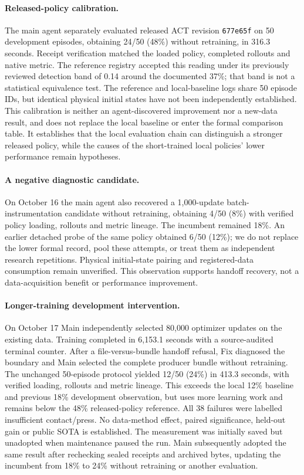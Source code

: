 \documentclass[10pt,twocolumn,letterpaper]{article}
\begin{document}
\paragraph{Released-policy calibration.}
The main agent separately evaluated released ACT revision
\texttt{677e65f} on 50 development episodes, obtaining 24/50 (48\%)
without retraining, in 316.3 seconds. Receipt verification matched the loaded
policy, completed rollouts and native metric. The reference registry accepted
this reading under its previously reviewed detection band of 0.14 around the
documented 37\%; that band is not a statistical equivalence test. The reference
and local-baseline logs share 50 episode IDs, but identical physical initial
states have not been independently established. This calibration is neither an
agent-discovered improvement nor a new-data result, and does not replace the
local baseline or enter the formal comparison table. It establishes that the
local evaluation chain can distinguish a stronger released policy, while the
causes of the short-trained local policies' lower performance remain hypotheses.

\paragraph{A negative diagnostic candidate.}
On October 16 the main agent also recovered a 1,000-update batch-instrumentation
candidate without retraining, obtaining 4/50 (8\%) with verified policy loading,
rollouts and metric lineage. The incumbent remained 18\%. An earlier detached
probe of the same policy obtained 6/50 (12\%); we do not replace the lower formal
record, pool these attempts, or treat them as independent research repetitions.
Physical initial-state pairing and registered-data consumption remain unverified.
This observation supports handoff recovery, not a data-acquisition benefit or
performance improvement.

\paragraph{Longer-training development intervention.}
On October 17 Main independently selected 80,000 optimizer updates on the existing
data. Training completed in 6,153.1 seconds with a source-audited terminal counter.
After a file-versus-bundle handoff refusal, Fix diagnosed the boundary and Main
selected the complete producer bundle without retraining. The unchanged
50-episode protocol yielded 12/50 (24\%) in 413.3 seconds, with verified loading,
rollouts and metric lineage. This exceeds the local 12\% baseline and previous
18\% development observation, but uses more learning work and remains below the
48\% released-policy reference. All 38 failures were labelled insufficient
contact/press. No data-method effect, paired significance, held-out gain or
public SOTA is established. The measurement was initially saved but unadopted
when maintenance paused the run. Main subsequently adopted the same result
after rechecking sealed receipts and archived bytes, updating the incumbent
from 18\% to 24\% without retraining or another evaluation.
\end{document}
